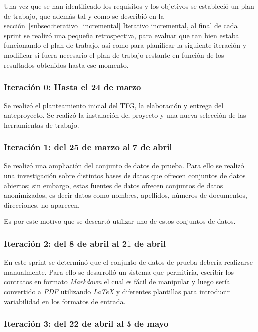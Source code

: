 Una vez que se han identificado los requisitos y los objetivos se estableció un plan de trabajo, que además tal y como
se describió en la sección~\ref{subsec:iterativo_incremental} Iterativo incremental, al final de cada sprint se realizó
una pequeña retrospectiva, para evaluar que tan bien estaba funcionando el plan de trabajo, así como para planificar
la siguiente iteración y modificar si fuera necesario el plan de trabajo restante en función de los resultados obtenidos
hasta ese momento.

\subsubsection*{Iteración 0: Hasta el 24 de marzo}

Se realizó el planteamiento inicial del TFG, la elaboración y entrega del anteproyecto.
Se realizó la instalación del proyecto y una nueva selección de las herramientas de trabajo.

\subsubsection*{Iteración 1: del 25 de marzo al 7 de abril}

Se realizó una ampliación del conjunto de datos de prueba.
Para ello se realizó una investigación sobre distintos bases de datos que ofrecen conjuntos de datos abiertos; sin
embargo, estas fuentes de datos ofrecen conjuntos de datos anonimizados, es decir datos como nombres, apellidos,
números de documentos, direcciones, no aparecen.

Es por este motivo que se descartó utilizar uno de estos conjuntos de datos.

\subsubsection*{Iteración 2: del 8 de abril al 21 de abril}

En este sprint se determinó que el conjunto de datos de prueba debería realizarse manualmente.
Para ello se desarrolló un sistema que permitiría, escribir los contratos en formato \textit{Markdown} el cual es fácil
de manipular y luego sería convertido a \textit{PDF} utilizando \textit{LaTeX} y diferentes plantillas para introducir
variabilidad en los formatos de entrada.

\subsubsection*{Iteración 3: del 22 de abril al 5 de mayo}

